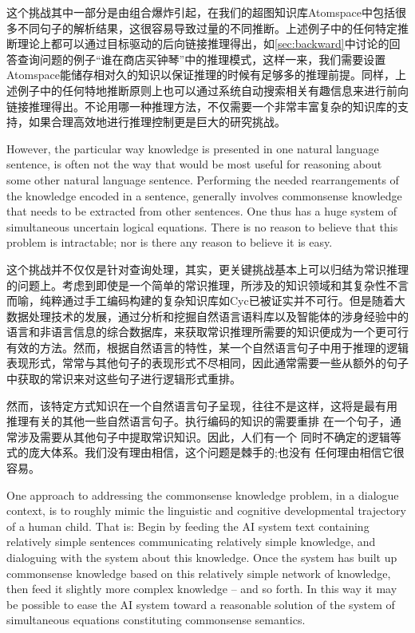 这个挑战其中一部分是由组合爆炸引起，在我们的超图知识库Atomspace中包括很多不同句子的解析结果，这很容易导致过量的不同推断。上述例子中的任何特定推断理论上都可以通过目标驱动的后向链接推理得出，如\ref{sec:backward}中讨论的回答查询问题的例子“谁在商店买钟琴”中的推理模式，这样一来，我们需要设置Atomspace能储存相对久的知识以保证推理的时候有足够多的推理前提。同样，上述例子中的任何特地推断原则上也可以通过系统自动搜索相关有趣信息来进行前向链接推理得出。不论用哪一种推理方法，不仅需要一个非常丰富复杂的知识库的支持，如果合理高效地进行推理控制更是巨大的研究挑战。

However, the particular way knowledge is presented in one natural language sentence, is often not the way that would be most useful
for reasoning about some other natural language sentence.  Performing the needed rearrangements of the knowledge encoded
in a sentence, generally involves commonsense knowledge that needs to be extracted from other sentences.  One thus has a
huge system of simultaneous uncertain logical equations.   There is no reason to believe that this problem is intractable; nor is there
any reason to believe it is easy.

这个挑战并不仅仅是针对查询处理，其实，更关键挑战基本上可以归结为常识推理的问题上\cite{RWR}。考虑到即使是一个简单的常识推理，所涉及的知识领域和其复杂性不言而喻，纯粹通过手工编码构建的复杂知识库如Cyc\cite{Lenat1990}已被证实并不可行。但是随着大数据处理技术的发展，通过分析和挖掘自然语言语料库以及智能体的涉身经验中的语言和非语言信息的综合数据库，来获取常识推理所需要的知识便成为一个更可行有效的方法。然而，根据自然语言的特性，某一个自然语言句子中用于推理的逻辑表现形式，常常与其他句子的表现形式不尽相同，因此通常需要一些从额外的句子中获取的常识来对这些句子进行逻辑形式重排。



然而，该特定方式知识在一个自然语言句子呈现，往往不是这样，这将是最有用
推理有关的其他一些自然语言句子。执行编码的知识的需要重排
在一个句子，通常涉及需要从其他句子中提取常识知识。因此，人们有一个
同时不确定的逻辑等式的庞大体系。我们没有理由相信，这个问题是棘手的;也没有
任何理由相信它很容易。

One approach to addressing the commonsense knowledge problem, in a dialogue context, is to roughly mimic the linguistic
and cognitive developmental trajectory of a human child.  That is: Begin by feeding the AI system text containing relatively
simple sentences communicating relatively simple knowledge, and dialoguing with the system about this knowledge.   Once
the system has built up commonsense knowledge based on this relatively simple network of knowledge, then feed it slightly
more complex knowledge -- and so forth.  In this way it may be possible to ease the AI system toward a reasonable solution
of the system of simultaneous equations constituting commonsense semantics.

